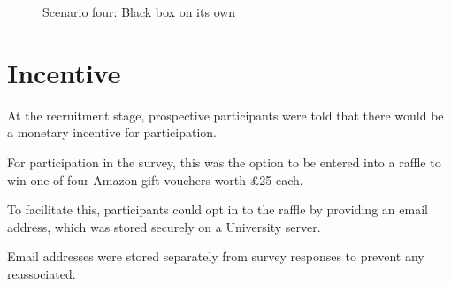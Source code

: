 \documentclass[manuscript,screen,review]{acmart}
\begin{document}
\begin{figure}[h]
    \caption{Scenario four: Black box on its own}
    \label{fig:questionnaire-scenario-4}
\end{figure}

\section{Incentive}  


At the recruitment stage, prospective participants were told that there would be a monetary incentive for participation.

For participation in the survey, this was the option to be entered into a raffle to win one of four Amazon gift vouchers worth £25 each.

To facilitate this, participants could opt in to the raffle by providing an email address, which was stored securely on a University server. 

Email addresses were stored separately from survey responses to prevent any reassociated. 
\end{document}
